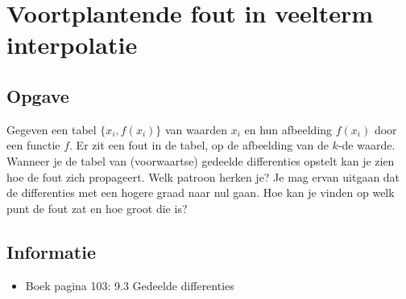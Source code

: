 \documentclass[examenvragen.tex]{subfiles}
\begin{document}
\section{Voortplantende fout in veelterm interpolatie}
\subsection{Opgave}
Gegeven een tabel $\{x_i,f(x_i)\}$ van waarden $x_i$ en hun afbeelding $f(x_i)$ door een functie $f$. Er zit een fout in de tabel, op de afbeelding van de $k$-de waarde. Wanneer je de tabel van (voorwaartse) gedeelde differenties opstelt kan je zien hoe de fout zich propageert. Welk patroon herken je? Je mag ervan uitgaan dat de differenties met een hogere graad naar nul gaan. Hoe kan je vinden op welk punt de fout zat en hoe groot die is?

\subsection{Informatie}
\begin{itemize}
\item Boek pagina 103: 9.3 Gedeelde differenties
\end{itemize}
\end{document}
